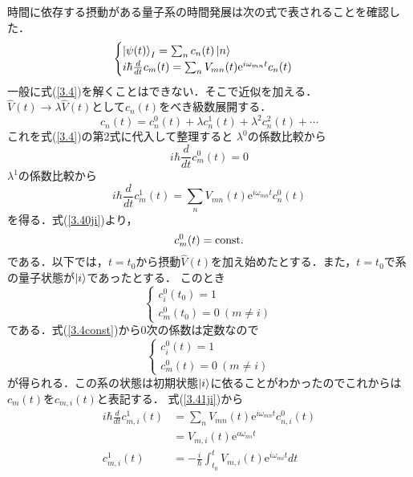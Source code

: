 \documentclass{report}
\begin{document}
  時間に依存する摂動がある量子系の時間発展は次の式で表されることを確認した．
  \begin{equation}
    \begin{cases}
      \label{3.4}
    \ket{\psi(t)}_I=\sum_{n}c_n(t)\ket{n}\\
    i\hbar\frac{d}{dt}c_m(t)=\sum_{n}V_{mn}(t)\mathrm{e}^{i\omega_{mn}t}c_n(t)
    \end{cases}
  \end{equation}
  一般に式(\ref{3.4})を解くことはできない．そこで近似を加える．\\
  $\hat{V}(t)\to\lambda\hat{V}(t)$として$c_n(t)$をべき級数展開する．
  \begin{equation}
    c_n(t)=c_n^0(t)+\lambda c_n^1(t)+\lambda^2c_n^2(t)+\cdots
  \end{equation}
  これを式(\ref{3.4})の第2式に代入して整理すると
  $\lambda^0$の係数比較から
  \begin{equation}
    \label{3.40ji}
    i\hbar\frac{d}{dt}c_m^0(t)=0
  \end{equation}
  $\lambda^1$の係数比較から
  \begin{equation}
    \label{3.41ji}
    i\hbar\frac{d}{dt}c_m^1(t)=\sum_{n}V_{mn}(t)\mathrm{e}^{i\omega_{mn}t}c_n^0(t)
  \end{equation}
  を得る．式(\ref{3.40ji})より，
  \begin{equation}
    \label{3.4const}
    c_m^0(t)=\rm{const.}
  \end{equation}
  である．以下では，$t=t_0$から摂動$\hat{V}(t)$を加え始めたとする．また，$t=t_0$で系の量子状態が$\ket{i}$であったとする．
  このとき
  \begin{equation}
    \begin{cases}
      c_i^0(t_0)=1\\
      c_m^0(t_0)=0\ (m\ne i)
    \end{cases}
  \end{equation}
  である．式(\ref{3.4const})から0次の係数は定数なので
  \begin{equation}
    \begin{cases}
      c_i^0(t)=1\\
      c_m^0(t)=0\ (m\ne i)
    \end{cases}
  \end{equation}
  が得られる．この系の状態は初期状態$\ket{i}$に依ることがわかったのでこれからは$c_m(t)$を$c_{m,i}(t)$と表記する．
  式(\ref{3.41ji})から
  \begin{align}
    i\hbar\frac{d}{dt}c_{m,i}^1(t)&=\sum_{n}V_{mn}(t)\mathrm{e}^{i\omega_{mn}t}c_{n,i}^0(t)\\
    &=V_{m,i}(t)\mathrm{e}^{o\omega_{mi}t}\\
    c_{m,i}^1(t)&=-\frac{i}{\hbar}\int_{t_0}^{t}V_{m,i}(t)\mathrm{e}^{i\omega_{mi}t}dt
  \end{align}
\end{document}
